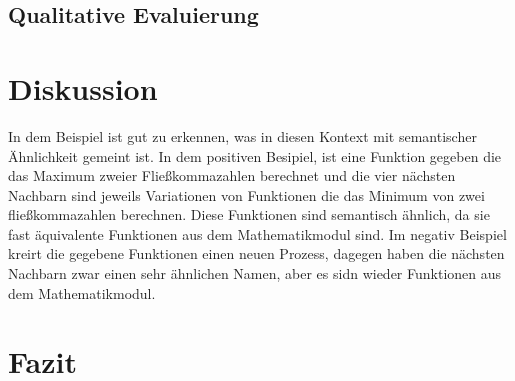 \documentclass[12pt,letterpaper,ngerman]{article}
\begin{document}
\subsection{Qualitative Evaluierung} 
\section{Diskussion}

In dem Beispiel ist gut zu erkennen, was in diesen Kontext mit semantischer
Ähnlichkeit gemeint ist. In dem positiven Besipiel, ist eine Funktion gegeben
die das Maximum zweier Fließkommazahlen berechnet und die vier
nächsten Nachbarn sind jeweils Variationen von Funktionen die das
Minimum von zwei fließkommazahlen berechnen. Diese Funktionen sind
semantisch ähnlich, da sie fast äquivalente Funktionen aus dem
Mathematikmodul sind. Im negativ Beispiel kreirt die 
gegebene Funktionen einen neuen Prozess, dagegen haben die nächsten
Nachbarn zwar einen sehr ähnlichen Namen, aber es sidn wieder Funktionen
aus dem Mathematikmodul.\\
\section{Fazit}
\end{document}

